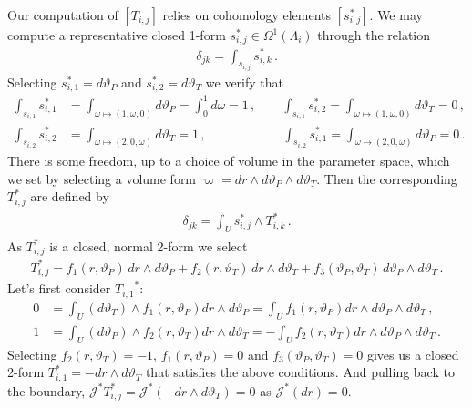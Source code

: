 \documentclass[11pt]{article}
\theoremstyle{plain}
\theoremstyle{definition}
\theoremstyle{remark}
\newcommand{\ST}{\Lambda}
\begin{document}
Our computation of \([T_{i, j}]\) relies on cohomology elements \([s_{i,j}^*]\). We may compute a representative closed 1-form \(s_{i,j}^* \in \Omega^1 (\ST_i) \) through the relation
\begin{align*}
    \delta_{jk}  = \int_{s_{i,j}} s_{i,k}^* \, . 
\end{align*}
Selecting \(s_{i,1}^* = d \vartheta_P \) and \(s_{i,2}^* = d \vartheta_T \) we verify that 
\begin{align*}
    \int_{s_{i,1}} s_{i,1}^* &= \int_{\omega \mapsto  (1,  \omega , 0)} d \vartheta_P  = \int_{0}^1 d  \omega  = 1 \, , \qquad
    \int_{s_{i,1}} s_{i,2}^* = \int_{\omega \mapsto  (1,  \omega , 0)} d \vartheta_T  =  0 \, , \\
    \int_{s_{i,2}} s_{i,2}^* &= \int_{\omega \mapsto  (2, 0,  \omega )} d \vartheta_T  = 1 \, , \qquad \hspace{4em}
    \int_{s_{i,2}} s_{i,1}^* = \int_{\omega \mapsto  (2, 0, \omega )} d \vartheta_P  =0 \, .
\end{align*}
There is some freedom, up to a choice of volume in the parameter space, which we set by selecting a volume form \(\varpi = dr \wedge d \vartheta_P \wedge d \vartheta_T\). Then the corresponding \(T_{i, j}^*\) are defined by
\begin{align*}
\begin{gathered}
        \delta_{jk} =  \int_{ U } s_{i,j}^* \wedge T_{i, k}^* \,  .
\end{gathered}
\end{align*}
As \(T_{i, j}^*\) is a closed, normal 2-form we select 
\begin{align*}
    T_{i, j}^* = f_1(r, \vartheta_P) \,  d r \wedge d \vartheta_P + f_2(r, \vartheta_T) \, d r \wedge d \vartheta_T + f_3(\vartheta_P, \vartheta_T) \, d \vartheta_P \wedge d \vartheta_T \, . 
\end{align*}
Let's first consider \({T_{i,1}}^*\):
\begin{align*}
    0 &= \int_U (d \vartheta_T)  \wedge f_1(r, \vartheta_P) d r \wedge d \vartheta_P = \int_U f_1(r, \vartheta_P)  d r \wedge d \vartheta_P \wedge d \vartheta_T  \, , \\
    1 &= \int_U (d \vartheta_P)  \wedge f_2(r, \vartheta_T) d r \wedge d \vartheta_T = - \int_U f_2(r, \vartheta_T) d r \wedge d \vartheta_P \wedge d \vartheta_T   \, .
\end{align*}
Selecting \(f_2(r, \vartheta_T) = - 1\), \(f_1(r, \vartheta_P) = 0\) and \(f_3(\vartheta_P, \vartheta_T) = 0\) gives us a closed 2-form \(T_{i,1}^* = -  d r \wedge d \vartheta_T \) that satisfies the above conditions. And pulling back to the boundary, \(\mathcal{J}^* T_{i, j}^* = \mathcal{J}^* ( - d r \wedge d \vartheta_T) = 0 \) as \(\mathcal{J}^* (dr)=0\). 
\end{document}
